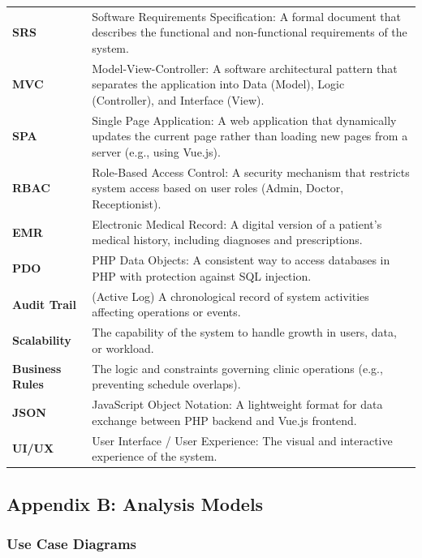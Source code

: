 \begin{tabularx}{\textwidth}{l L}
	\textbf{SRS} & Software Requirements Specification: A formal document that describes the functional and non-functional requirements of the system. \\ \addlinespace
	\textbf{MVC} & Model-View-Controller: A software architectural pattern that separates the application into Data (Model), Logic (Controller), and Interface (View). \\ \addlinespace
	\textbf{SPA} & Single Page Application: A web application that dynamically updates the current page rather than loading new pages from a server (e.g., using Vue.js). \\ \addlinespace
	\textbf{RBAC} & Role-Based Access Control: A security mechanism that restricts system access based on user roles (Admin, Doctor, Receptionist). \\ \addlinespace
	\textbf{EMR} & Electronic Medical Record: A digital version of a patient’s medical history, including diagnoses and prescriptions. \\ \addlinespace
	\textbf{PDO} & PHP Data Objects: A consistent way to access databases in PHP with protection against SQL injection. \\ \addlinespace
	\textbf{Audit Trail} & (Active Log) A chronological record of system activities affecting operations or events. \\ \addlinespace
	\textbf{Scalability} & The capability of the system to handle growth in users, data, or workload. \\ \addlinespace
	\textbf{Business Rules} & The logic and constraints governing clinic operations (e.g., preventing schedule overlaps). \\ \addlinespace
	\textbf{JSON} & JavaScript Object Notation: A lightweight format for data exchange between PHP backend and Vue.js frontend. \\ \addlinespace
	\textbf{UI/UX} & User Interface / User Experience: The visual and interactive experience of the system. \\
	
	\bottomrule
\end{tabularx}
\newpage
\subsection{Appendix B: Analysis Models}

\subsubsection{Use Case Diagrams}
